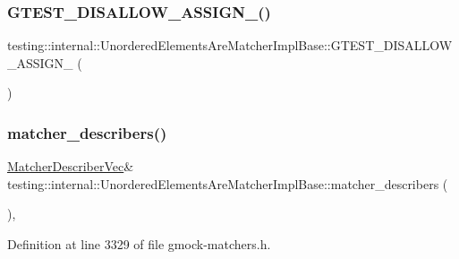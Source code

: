 \subsubsection{\texorpdfstring{G\+T\+E\+S\+T\+\_\+\+D\+I\+S\+A\+L\+L\+O\+W\+\_\+\+A\+S\+S\+I\+G\+N\+\_\+()}{GTEST\_DISALLOW\_ASSIGN\_()}}
{\footnotesize\ttfamily testing\+::internal\+::\+Unordered\+Elements\+Are\+Matcher\+Impl\+Base\+::\+G\+T\+E\+S\+T\+\_\+\+D\+I\+S\+A\+L\+L\+O\+W\+\_\+\+A\+S\+S\+I\+G\+N\+\_\+ (\begin{DoxyParamCaption}\item[{\hyperlink{classtesting_1_1internal_1_1UnorderedElementsAreMatcherImplBase}{Unordered\+Elements\+Are\+Matcher\+Impl\+Base}}]{ }\end{DoxyParamCaption})\hspace{0.3cm}{\ttfamily [private]}}

\mbox{\label{classtesting_1_1internal_1_1UnorderedElementsAreMatcherImplBase_a04d4adc809d9c06331f8dbb67b879ac0}} 
\subsubsection{\texorpdfstring{matcher\+\_\+describers()}{matcher\_describers()}}
{\footnotesize\ttfamily \hyperlink{classtesting_1_1internal_1_1UnorderedElementsAreMatcherImplBase_a81ca7ce793d4b25ce2a7d3e28b48cd64}{Matcher\+Describer\+Vec}\& testing\+::internal\+::\+Unordered\+Elements\+Are\+Matcher\+Impl\+Base\+::matcher\+\_\+describers (\begin{DoxyParamCaption}{ }\end{DoxyParamCaption})\hspace{0.3cm}{\ttfamily [inline]}, {\ttfamily [protected]}}



Definition at line 3329 of file gmock-\/matchers.\+h.


